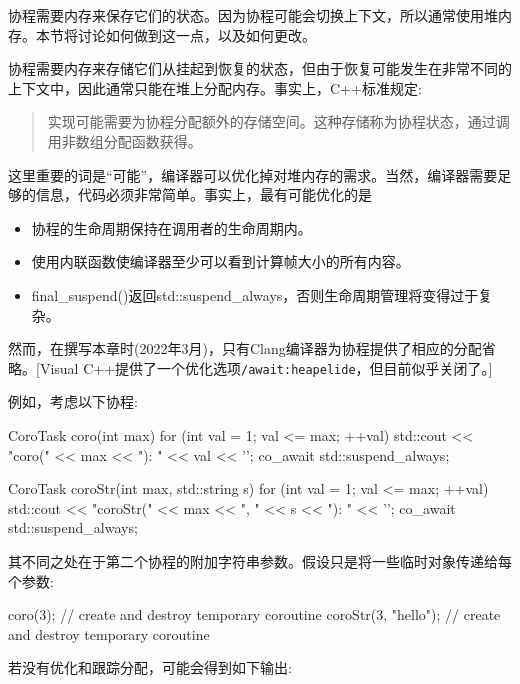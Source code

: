 

协程需要内存来保存它们的状态。因为协程可能会切换上下文，所以通常使用堆内存。本节将讨论如何做到这一点，以及如何更改。


协程需要内存来存储它们从挂起到恢复的状态，但由于恢复可能发生在非常不同的上下文中，因此通常只能在堆上分配内存。事实上，C++标准规定:

\begin{quote}
实现可能需要为协程分配额外的存储空间。这种存储称为协程状态，通过调用非数组分配函数获得。
\end{quote}

这里重要的词是“可能”，编译器可以优化掉对堆内存的需求。当然，编译器需要足够的信息，代码必须非常简单。事实上，最有可能优化的是

\begin{itemize}
\item
协程的生命周期保持在调用者的生命周期内。

\item
使用内联函数使编译器至少可以看到计算帧大小的所有内容。

\item
final\_suspend()返回std::suspend\_always{}，否则生命周期管理将变得过于复杂。
\end{itemize}

然而，在撰写本章时(2022年3月)，只有Clang编译器为协程提供了相应的分配省略。[Visual C++提供了一个优化选项\texttt{/await:heapelide}，但目前似乎关闭了。]

例如，考虑以下协程:

\begin{cpp}
CoroTask coro(int max)
{
	for (int val = 1; val <= max; ++val) {
		std::cout << "coro(" << max << "): " << val << '\n';
		co_await std::suspend_always{};
	}
}

CoroTask coroStr(int max, std::string s)
{
	for (int val = 1; val <= max; ++val) {
		std::cout << "coroStr(" << max << ", " << s << "): " << '\n';
		co_await std::suspend_always{};
	}
}
\end{cpp}

其不同之处在于第二个协程的附加字符串参数。假设只是将一些临时对象传递给每个参数:

\begin{cpp}
coro(3); // create and destroy temporary coroutine
coroStr(3, "hello"); // create and destroy temporary coroutine
\end{cpp}

若没有优化和跟踪分配，可能会得到如下输出:

